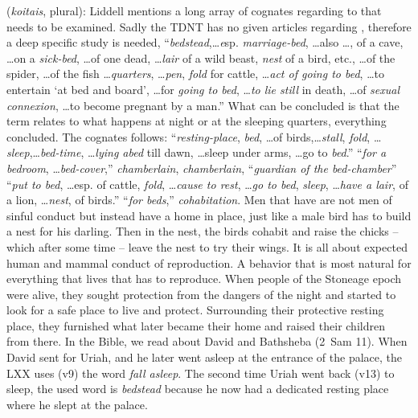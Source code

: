\item[Nests (multiple),]

(\textit{koitais}, plural):
Liddell mentions a long array of cognates regarding to  that needs to be examined. Sadly the TDNT has no given articles regarding , therefore a deep specific study is needed,  ``\emph{bedstead},\ldots \emph esp. \emph{marriage-bed}, \ldots also \ldots, of a cave, \ldots on a \emph{sick-bed}, \ldots of one dead, \ldots \emph{lair} of a wild beast, \emph{nest} of a bird, etc., \ldots of the spider, \ldots of the fish \ldots \emph{quarters}, \ldots \emph{pen}, \emph{fold} for cattle, \ldots \emph{act of going to bed}, \ldots to entertain `at bed and board', \ldots for \emph{going to bed}, \ldots \emph{to lie still} in death, \ldots of \emph{sexual connexion}, \ldots to become pregnant by a man.'' What can be concluded is that the term relates to what happens at night or at the sleeping quarters, everything concluded. The cognates follows:  ``\emph{resting-place}, \emph{bed}, \ldots of birds,\ldots \emph{stall}, \emph{fold}, \ldots \emph{sleep},\ldots \emph{bed-time}, \ldots \emph{lying abed} till dawn, \ldots sleep under arms, \ldots go to \emph{bed}.''  ``\emph{for a bedroom}, \ldots \emph{bed-cover},''  \emph{chamberlain},  \emph{chamberlain},  ``\emph{guardian of the bed-chamber}''  ``\emph{put to bed}, \ldots esp. of cattle, \emph{fold}, \ldots \emph{cause to rest}, \ldots \emph{go to bed}, \emph{sleep}, \ldots \emph{have a lair}, of a lion, \ldots \emph{nest}, of birds.''  ``\emph{for beds},''  \emph{cohabitation}.
Men that have  are not men of sinful conduct but instead have a home in place, just like a male bird has to build a nest for his darling. Then in the nest, the birds cohabit and raise the chicks -- which after some time -- leave the nest to try their wings. It is all about expected human and mammal conduct of reproduction. A behavior that is most natural for everything that lives that has to reproduce.
When people of the Stoneage epoch were alive, they sought protection from the dangers of the night and started to look for a safe place to live and protect. Surrounding their protective resting place, they furnished what later became their home and raised their children from there.
In the Bible, we read about David and Bathsheba (2~Sam 11). When David sent for Uriah, and he later went asleep at the entrance of the palace, the LXX uses (v9) the word  \emph{fall asleep}. The second time Uriah went back (v13) to sleep, the used word is  \emph{bedstead} because he now had a dedicated resting place where he slept at the palace.
